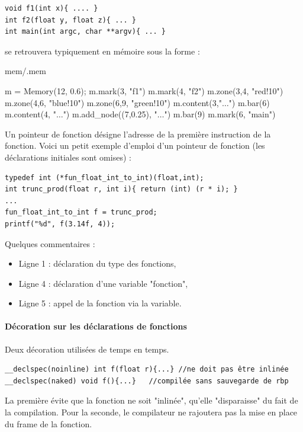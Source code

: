 \documentclass{book}
\newcounter{Qcours}
\newenvironment{memory}{%
	\noindent
	\VerbatimEnvironment\stepcounter{Qcours}%
	\begin{VerbatimOut}{mem/\theQcours.mem}%
	}{\end{VerbatimOut}%
}
\begin{document}
\begin{verbatim}
void f1(int x){ .... }
int f2(float y, float z){ ... }
int main(int argc, char **argv){ ... }
\end{verbatim}

\noindent se retrouvera typiquement en mémoire sous la forme : 

\medskip
\begin{memory}
m = Memory(12, 0.6);
m.mark(3, "f1")
m.mark(4, "f2")
m.zone(3,4, "red!10")
m.zone(4,6, "blue!10")
m.zone(6,9,  "green!10")
m.content(3,"$\ldots$")
m.bar(6)
m.content(4, "$\ldots$")
m.add_node((7,0.25), "$\ldots$")
m.bar(9)
m.mark(6, "main")
\end{memory}

Un pointeur de fonction désigne l'adresse de la première instruction de la fonction. Voici un petit exemple d'emploi d'un pointeur de fonction (les déclarations initiales sont omises) : 

\begin{verbatim}
typedef int (*fun_float_int_to_int)(float,int);
int trunc_prod(float r, int i){ return (int) (r * i); }
...
fun_float_int_to_int f = trunc_prod;
printf("%d", f(3.14f, 4));
\end{verbatim}

Quelques commentaires : 

\begin{itemize}
	\item Ligne 1 : déclaration du type des fonctions, 
	\item Ligne 4 : déclaration d'une variable "fonction",
	\item Ligne 5 : appel de la fonction via la variable. 
\end{itemize}

\paragraph{Décoration sur les déclarations de fonctions }

Deux décoration utilisées de temps en temps. 

\begin{verbatim}
__declspec(noinline) int f(float r){...} //ne doit pas être inlinée
__declspec(naked) void f(){...}   //compilée sans sauvegarde de rbp
\end{verbatim}

La première évite que la fonction ne soit "inlinée", qu'elle "disparaisse" du fait de la compilation. Pour la seconde, le compilateur ne rajoutera pas la mise en place du frame de la fonction. 
\end{document}
